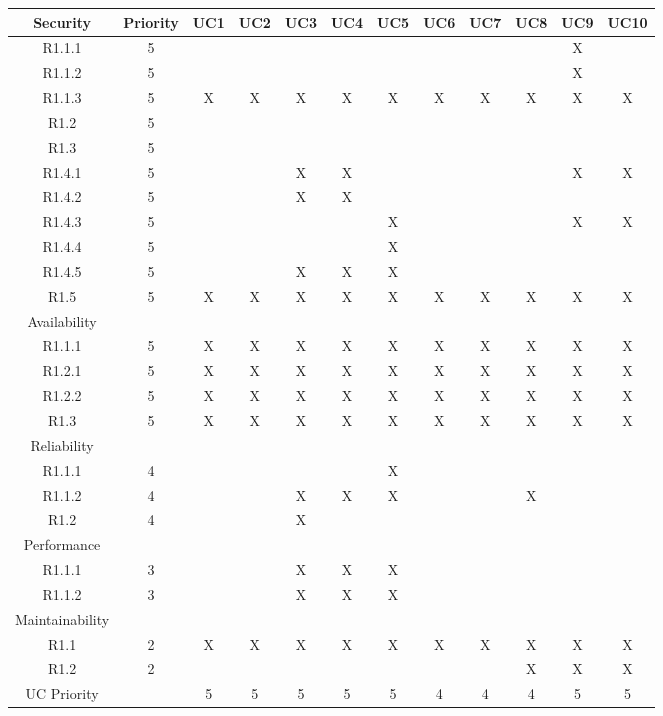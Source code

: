 \documentclass[11pt]{article}
\begin{document}
\begin{center}
	\begin{tabular}{|c|c|c|c|c|c|c|c|c|c|c|c|}
	\hline
	Security & Priority & UC1 & UC2 & UC3 & UC4 & UC5 & UC6 & UC7 & UC8 & UC9 & UC10 \\
	\hline
	R1.1.1 & 5 & & & & & & & & & X & \\
	\hline
	R1.1.2 & 5 &  & & & & & & & & X & \\
	\hline
	R1.1.3 & 5 & X & X & X & X & X & X & X & X & X & X \\
	\hline
	R1.2 & 5 & & & & & & & & & & \\
	\hline
	R1.3 & 5 & & & &  & & & & & & \\ 
	\hline
	R1.4.1 & 5 & & & X & X & & & & & X & X \\
	\hline
	R1.4.2 & 5 & & & X & X & & & & & & \\ 
	\hline
	R1.4.3 & 5 & & & & & X & & & & X & X \\
	\hline
	R1.4.4 & 5 & & & & & X & & & & & \\
	\hline
	R1.4.5 & 5 & & & X & X & X & & & & & \\
	\hline
	R1.5 & 5 & X & X & X & X & X & X & X & X & X & X \\
	\hline
	Availability & & & & & & & & & & & \\
	\hline
	R1.1.1 & 5 & X & X & X & X & X & X & X & X & X & X\\
	\hline
	R1.2.1 & 5 & X & X & X & X & X & X & X & X & X & X \\
	\hline
	R1.2.2 & 5 & X & X & X & X & X & X & X & X & X & X \\
	\hline
	R1.3 & 5 & X & X & X & X & X & X & X & X & X & X \\
	\hline
	Reliability & & & & & & & & & & & \\
	\hline
	R1.1.1 & 4 & & & & & X & & & & & \\
	\hline
	R1.1.2 & 4 & & & X & X & X & & & X & & \\
	\hline
	R1.2 & 4 & & & X & & & & & & & \\
	\hline
	Performance & & & & & & & & & & & \\
	\hline
	R1.1.1 & 3 & & & X & X & X & & & & & \\
	\hline
	R1.1.2 & 3 & & & X & X & X & & &  & & \\
	\hline
	Maintainability & & & & & & & & & & & \\
	\hline
	R1.1 & 2 & X & X & X & X & X & X & X & X & X & X \\
	\hline
	R1.2 & 2 & & & & & & & & X & X & X \\
	\hline
	UC Priority & & 5 & 5 & 5 & 5 & 5 & 4 & 4 & 4 & 5 & 5 \\
	\hline
	\end{tabular}
\end{center}
\end{document}
